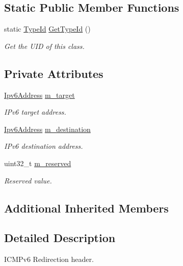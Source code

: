 \subsection*{Static Public Member Functions}
\begin{DoxyCompactItemize}
\item 
static \hyperlink{classns3_1_1TypeId}{Type\+Id} \hyperlink{classns3_1_1Icmpv6Redirection_ae940e8b3a07a343dec6404b9283336b2}{Get\+Type\+Id} ()
\begin{DoxyCompactList}\small\item\em Get the U\+ID of this class. \end{DoxyCompactList}\end{DoxyCompactItemize}
\subsection*{Private Attributes}
\begin{DoxyCompactItemize}
\item 
\hyperlink{classns3_1_1Ipv6Address}{Ipv6\+Address} \hyperlink{classns3_1_1Icmpv6Redirection_a02922d245b49632f1705dff98390d8bc}{m\+\_\+target}
\begin{DoxyCompactList}\small\item\em I\+Pv6 target address. \end{DoxyCompactList}\item 
\hyperlink{classns3_1_1Ipv6Address}{Ipv6\+Address} \hyperlink{classns3_1_1Icmpv6Redirection_a0df467540aa03eb82b76daa1905b5d7e}{m\+\_\+destination}
\begin{DoxyCompactList}\small\item\em I\+Pv6 destination address. \end{DoxyCompactList}\item 
uint32\+\_\+t \hyperlink{classns3_1_1Icmpv6Redirection_af36c40a4afb2797bb42114eb4d873ee3}{m\+\_\+reserved}
\begin{DoxyCompactList}\small\item\em Reserved value. \end{DoxyCompactList}\end{DoxyCompactItemize}
\subsection*{Additional Inherited Members}


\subsection{Detailed Description}
I\+C\+M\+Pv6 Redirection header. 

